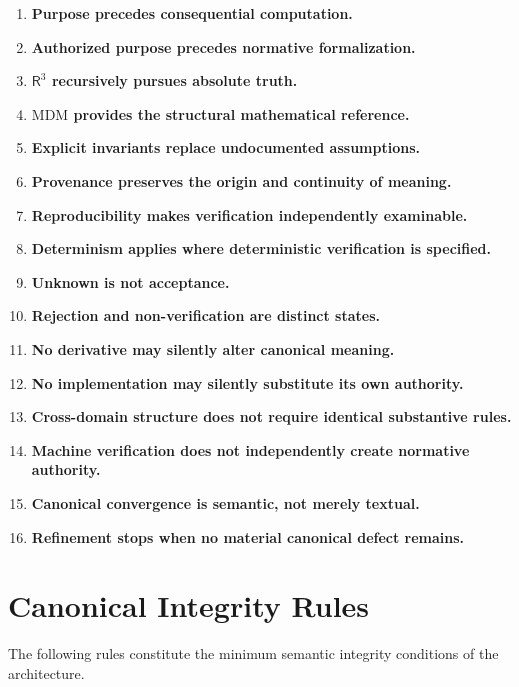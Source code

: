 \documentclass[11pt]{article}
\newcommand{\Rthree}{\ensuremath{\mathsf{R}^{3}}}
\newcommand{\MDM}{\ensuremath{\mathrm{MDM}}}
\begin{document}
\begin{enumerate}
    \item \textbf{Purpose precedes consequential computation.}
    \item \textbf{Authorized purpose precedes normative formalization.}
    \item \textbf{\Rthree{} recursively pursues absolute truth.}
    \item \textbf{\MDM{} provides the structural mathematical reference.}
    \item \textbf{Explicit invariants replace undocumented assumptions.}
    \item \textbf{Provenance preserves the origin and continuity of meaning.}
    \item \textbf{Reproducibility makes verification independently examinable.}
    \item \textbf{Determinism applies where deterministic verification is specified.}
    \item \textbf{Unknown is not acceptance.}
    \item \textbf{Rejection and non-verification are distinct states.}
    \item \textbf{No derivative may silently alter canonical meaning.}
    \item \textbf{No implementation may silently substitute its own authority.}
    \item \textbf{Cross-domain structure does not require identical substantive rules.}
    \item \textbf{Machine verification does not independently create normative authority.}
    \item \textbf{Canonical convergence is semantic, not merely textual.}
    \item \textbf{Refinement stops when no material canonical defect remains.}
\end{enumerate}

\section{Canonical Integrity Rules}

The following rules constitute the minimum semantic integrity
conditions of the architecture.
\end{document}
